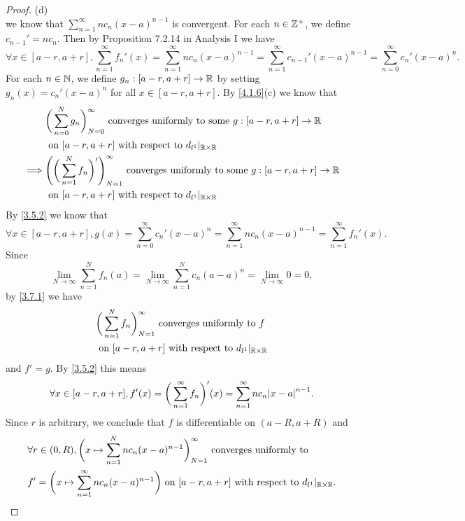 \begin{proof}{(d)}
\[  \]
  we know that \(\sum_{n = 1}^\infty n c_n (x - a)^{n - 1}\) is convergent.
  For each \(n \in \mathbb{Z}^+\), we define \(c_{n - 1}' = n c_n\).
  Then by Proposition 7.2.14 in Analysis I we have
  \[
    \forall x \in [a - r, a + r], \sum_{n = 1}^\infty f_n'(x) = \sum_{n = 1}^\infty n c_n (x - a)^{n - 1} = \sum_{n = 1}^\infty c_{n - 1}' (x - a)^{n - 1} = \sum_{n = 0}^\infty c_n' (x - a)^n.
  \]
  For each \(n \in \mathbb{N}\), we define \(g_n : [a - r, a + r] \to \mathbb{R}\) by setting \(g_n(x) = c_n' (x - a)^n\) for all \(x \in [a - r, a + r]\).
  By \cref{4.1.6}(c) we know that
  \begin{align*}
             & \bigg(\sum_{n = 0}^N g_n\bigg)_{N = 0}^\infty \text{ converges uniformly to some } g : [a - r, a + r] \to \mathbb{R}              \\
             & \text{ on } [a - r, a + r] \text{ with respect to } d_{l^1}|_{\mathbb{R} \times \mathbb{R}}                                               \\
    \implies & \Bigg(\bigg(\sum_{n = 1}^N f_n\bigg)'\Bigg)_{N = 1}^\infty \text{ converges uniformly to some } g : [a - r, a + r] \to \mathbb{R} \\
             & \text{ on } [a - r, a + r] \text{ with respect to } d_{l^1}|_{\mathbb{R} \times \mathbb{R}}
  \end{align*}
  By \cref{3.5.2} we know that
  \[
    \forall x \in [a - r, a + r], g(x) = \sum_{n = 0}^\infty c_n' (x - a)^n = \sum_{n = 1}^\infty n c_n (x - a)^{n - 1} = \sum_{n = 1}^\infty f_n'(x).
  \]
  Since
  \[
    \lim_{N \to \infty} \sum_{n = 1}^N f_n(a) = \lim_{N \to \infty} \sum_{n = 1}^N c_n (a - a)^n = \lim_{N \to \infty} 0 = 0,
  \]
  by \cref{3.7.1} we have
  \begin{align*}
     & \bigg(\sum_{n = 1}^N f_n\bigg)_{N = 1}^\infty \text{ converges uniformly to } f \\
     & \text{ on } [a - r, a + r] \text{ with respect to } d_{l^1}|_{\mathbb{R} \times \mathbb{R}}
  \end{align*}
  and \(f' = g\).
  By \cref{3.5.2} this means
  \[
    \forall x \in [a - r, a + r], f'(x) = \bigg(\sum_{n = 1}^\infty f_n\bigg)'(x) = \sum_{n = 1}^\infty n c_n \abs{x - a}^{n - 1}.
  \]
  Since \(r\) is arbitrary, we conclude that \(f\) is differentiable on \((a - R, a + R)\) and
  \begin{align*}
     & \forall r \in (0, R), \bigg(x \mapsto \sum_{n = 1}^N n c_n (x - a)^{n - 1}\bigg)_{N = 1}^\infty \text{ converges uniformly to }                   \\
     & f' = \bigg(x \mapsto \sum_{n = 1}^\infty n c_n (x - a)^{n - 1}\bigg) \text{ on } [a - r, a + r] \text{ with respect to } d_{l^1}|_{\mathbb{R} \times \mathbb{R}}.
  \end{align*}
\end{proof}


